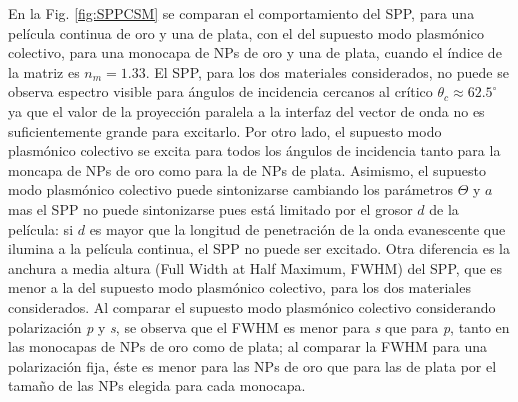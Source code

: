 En la Fig. \ref{fig:SPPCSM} se comparan el comportamiento del SPP, para una película continua de oro y una de plata, con el  del supuesto modo  plasmónico colectivo, para una monocapa de NPs de oro y una de plata, cuando el índice de la matriz es $n_m=1.33$. El SPP, para los dos materiales considerados, no puede se observa espectro visible para ángulos de incidencia cercanos al crítico $\theta_c\approx 62.5^\circ$ ya que el valor de la proyección paralela a la interfaz del vector de onda no es suficientemente grande para excitarlo. Por otro lado, el supuesto modo  plasmónico colectivo se excita para todos los ángulos de incidencia tanto para la moncapa de NPs de oro como para la de NPs de plata. Asimismo, el supuesto modo  plasmónico colectivo puede sintonizarse  cambiando los parámetros $\Theta$ y $a$ mas el SPP no puede sintonizarse pues está limitado por el grosor $d$ de la película: si $d$ es mayor que la longitud de penetración de la onda evanescente que ilumina a la película continua, el SPP no puede ser excitado. Otra diferencia es la anchura a media altura (Full Width at Half Maximum, FWHM) del SPP, que es menor a la del supuesto modo  plasmónico colectivo, para los dos materiales considerados. Al comparar el supuesto modo  plasmónico colectivo considerando polarización \emph{p} y \emph{s},  se observa  que el FWHM es menor para \emph{s} que para \emph{p}, tanto en las monocapas de NPs de oro como de plata; al comparar la FWHM para una polarización fija, éste es menor para las NPs de oro que para las de plata por el tamaño de las NPs elegida para cada monocapa.

